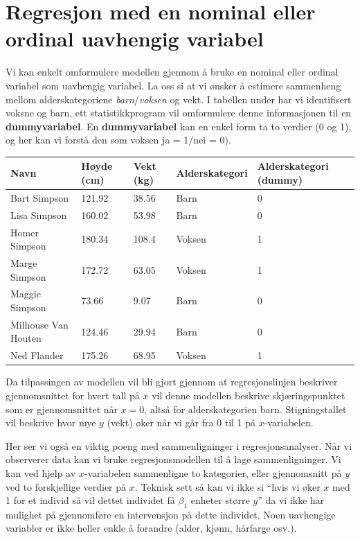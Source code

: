 \documentclass[
  letterpaper,
  DIV=11,
  numbers=noendperiod,
  oneside]{scrreprt}
\begin{document}
\hypertarget{regresjon-med-en-nominal-eller-ordinal-uavhengig-variabel}{%
\section{Regresjon med en nominal eller ordinal uavhengig
variabel}\label{regresjon-med-en-nominal-eller-ordinal-uavhengig-variabel}}

Vi kan enkelt omformulere modellen gjennom å bruke en nominal eller
ordinal variabel som uavhengig variabel. La oss si at vi ønsker å
estimere sammenheng mellom alderskategoriene \emph{barn}/\emph{voksen}
og vekt. I tabellen under har vi identifisert voksne og barn, ett
statistikkprogram vil omformulere denne informasjonen til en
\textbf{dummyvariabel}. En \textbf{dummyvariabel} kan en enkel form ta
to verdier (0 og 1), og her kan vi forstå den som voksen ja = 1/nei =
0).

\begin{longtable}[]{@{}lllll@{}}
\toprule\noalign{}
Navn & Høyde (cm) & Vekt (kg) & Alderskategori & Alderskategori
(dummy) \\
\midrule\noalign{}
\endhead
\bottomrule\noalign{}
\endlastfoot
Bart Simpson & 121.92 & 38.56 & Barn & 0 \\
Lisa Simpson & 160.02 & 53.98 & Barn & 0 \\
Homer Simpson & 180.34 & 108.4 & Voksen & 1 \\
Marge Simpson & 172.72 & 63.05 & Voksen & 1 \\
Maggie Simpson & 73.66 & 9.07 & Barn & 0 \\
Milhouse Van Houten & 124.46 & 29.94 & Barn & 0 \\
Ned Flander & 175.26 & 68.95 & Voksen & 1 \\
\end{longtable}

Da tilpassingen av modellen vil bli gjort gjennom at regresjonslinjen
beskriver gjennomsnittet for hvert tall på \(x\) vil denne modellen
beskrive skjæringspunktet som er gjennomsnittet når \(x=0\), altså for
alderskategorien barn. Stigningstallet vil beskrive hvor mye \(y\)
(vekt) øker når vi går fra 0 til 1 på \(x\)-variabelen.

Her ser vi også en viktig poeng med sammenligninger i
regresjonsanalyser. Når vi observerer data kan vi bruke
regresjonsmodellen til å lage sammenligninger. Vi kan ved hjelp av
\(x\)-variabelen sammenligne to kategorier, eller gjennomsnitt på \(y\)
ved to forskjellige verdier på \(x\). Teknisk sett så kan vi ikke si
``hvis vi øker \(x\) med 1 for et individ så vil dettet individet få
\(\beta_1\) enheter større \(y\)'' da vi ikke har mulighet på
gjennomføre en intervensjon på dette individet. Noen uavhengige
variabler er ikke heller enkle å forandre (alder, kjønn, hårfarge osv.).
\end{document}
